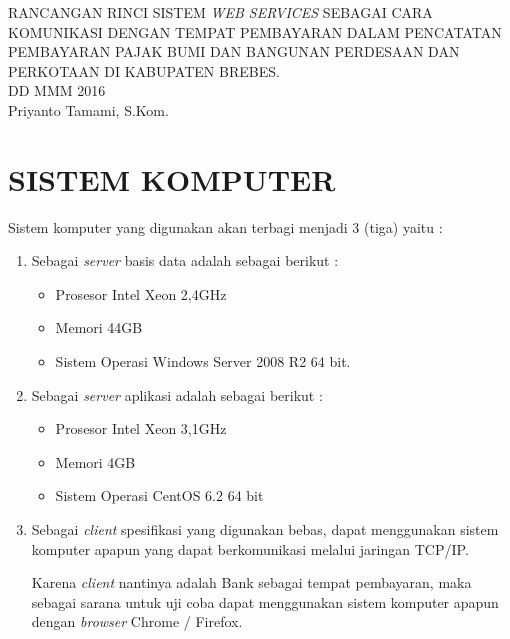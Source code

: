 \documentclass[pdftex,12pt, oneside]{article}
\begin{document}
\sloppy %

\begin{center}
{\large RANCANGAN RINCI SISTEM \textit{WEB SERVICES} SEBAGAI CARA KOMUNIKASI DENGAN TEMPAT PEMBAYARAN DALAM PENCATATAN PEMBAYARAN PAJAK BUMI DAN BANGUNAN PERDESAAN DAN PERKOTAAN DI KABUPATEN BREBES.}
\\[1cm]
DD MMM 2016\\
Priyanto Tamami, S.Kom.
\end{center}




\section{SISTEM KOMPUTER}

Sistem komputer yang digunakan akan terbagi menjadi 3 (tiga) yaitu :

\begin{enumerate}[1.]
  \item Sebagai \textit{server} basis data adalah sebagai berikut :

    \begin{itemize}
      \item Prosesor Intel Xeon 2,4GHz
      \item Memori 44GB
      \item Sistem Operasi Windows Server 2008 R2 64 bit.
    \end{itemize}
    
  \item Sebagai \textit{server} aplikasi adalah sebagai berikut :
  
    \begin{itemize}
      \item Prosesor Intel Xeon 3,1GHz
      \item Memori 4GB
      \item Sistem Operasi CentOS 6.2 64 bit
    \end{itemize}
    
  \item Sebagai \textit{client} spesifikasi yang digunakan bebas, dapat menggunakan sistem komputer apapun yang dapat berkomunikasi melalui jaringan TCP/IP.
  
  Karena \textit{client} nantinya adalah Bank sebagai tempat pembayaran, maka sebagai sarana untuk uji coba dapat menggunakan sistem komputer apapun dengan \textit{browser} Chrome / Firefox.

\end{enumerate}
\end{document}
